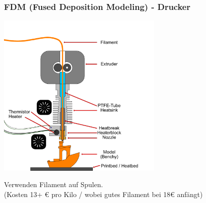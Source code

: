 \newpage
\subsubsection{FDM (Fused Deposition Modeling) - Drucker}
\begin{center}
  \vspace{-1,7cm}
  \includegraphics[width=0.6\textwidth]{./bilder/3dprinting.pdf}
\end{center}
Verwenden Filament auf Spulen.\\
(Kosten 13+ € pro Kilo / wobei gutes Filament bei 18€ anfängt)


\newpage %
